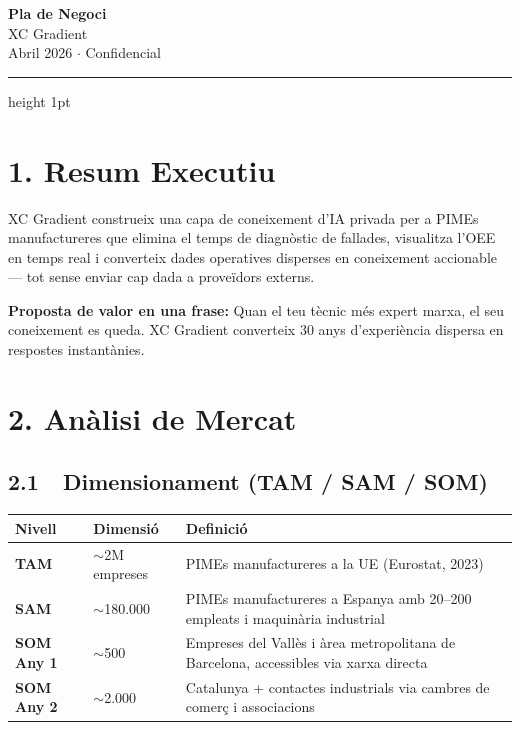 \documentclass[11pt,a4paper]{article}
\begin{document}
\begin{center}
{\Huge\bfseries\color{dark} Pla de Negoci}\\[0.3em]
{\Large\color{accent} XC Gradient}\\[0.5em]
{\small\color{midgray} Abril 2026 $\cdot$ Confidencial}
\end{center}

\vspace{0.5em}
{\color{accent}\hrule height 1pt}
\vspace{1em}

\section{1. Resum Executiu}

XC Gradient construeix una capa de coneixement d'IA privada per a PIMEs manufactureres que elimina el temps de diagnòstic de fallades, visualitza l'OEE en temps real i converteix dades operatives disperses en coneixement accionable --- tot sense enviar cap dada a proveïdors externs.

\begin{keybox}
\textbf{Proposta de valor en una frase:} Quan el teu tècnic més expert marxa, el seu coneixement es queda. XC Gradient converteix 30 anys d'experiència dispersa en respostes instantànies.
\end{keybox}

\section{2. Anàlisi de Mercat}

\subsection{2.1~~Dimensionament (TAM / SAM / SOM)}

\begin{center}
\renewcommand{\arraystretch}{1.3}
\begin{tabularx}{0.92\textwidth}{l l X}
\toprule
\textbf{Nivell} & \textbf{Dimensió} & \textbf{Definició} \\
\midrule
\textbf{TAM} & $\sim$2M empreses & PIMEs manufactureres a la UE (Eurostat, 2023) \\
\textbf{SAM} & $\sim$180.000 & PIMEs manufactureres a Espanya amb 20--200 empleats i maquinària industrial \\
\textbf{SOM Any 1} & $\sim$500 & Empreses del Vallès i àrea metropolitana de Barcelona, accessibles via xarxa directa \\
\textbf{SOM Any 2} & $\sim$2.000 & Catalunya + contactes industrials via cambres de comerç i associacions \\
\bottomrule
\end{tabularx}
\end{center}
\end{document}
